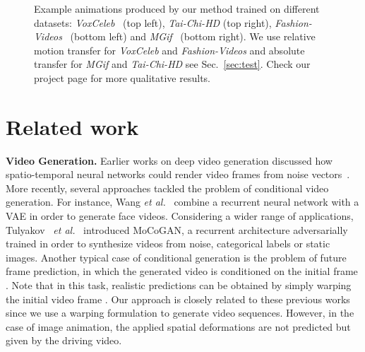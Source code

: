 \documentclass{article}
\def\etal{\textit{et al.}}
\begin{document}
\begin{figure*}[t]
{}

\caption{Example animations produced by our method trained on different datasets: \emph{VoxCeleb}~\cite{Nagrani17} (top left), \emph{Tai-Chi-HD} (top right), \emph{Fashion-Videos}~\cite{zablotskaia2019dwnet} (bottom left) and \emph{MGif}~\cite{siarohin2018animating} (bottom right). We use relative motion transfer for \emph{VoxCeleb} and \emph{Fashion-Videos} and absolute transfer for \emph{MGif} and \emph{Tai-Chi-HD} see Sec.~\ref{sec:test}. Check our project page for more qualitative results\protect\footnotemark[2].}

\label{fig:example-main}
\vspace{-0.5cm}
\end{figure*}



 \vspace{-0.2cm}
\section{Related work}
\vspace{-0.2cm}

\textbf{Video Generation.}
Earlier works on deep video generation discussed how spatio-temporal neural networks could render video frames from noise vectors~\cite{vondrick2016generating,saito2017temporal}. More recently, several approaches tackled the problem of conditional video generation. For instance, Wang \etal~\cite{wang2018every} combine a recurrent neural network with a VAE in order to generate face videos. 
Considering a wider range of applications, Tulyakov
~\etal~\cite{tulyakov2017mocogan} introduced MoCoGAN, a recurrent architecture adversarially trained in order to synthesize videos from noise, categorical labels or static images. Another typical case of conditional generation is the problem of future frame prediction, in which the generated video is conditioned on the initial frame \cite{finn2016unsupervised,oh2015action,srivastava2015unsupervised,van2017transformation,zhao2018learning}. Note that in this task, realistic predictions can be obtained by simply warping the initial video frame \cite{babaeizadeh2017stochastic,finn2016unsupervised,van2017transformation}. Our approach is closely related to these previous works since we use a warping formulation to generate video sequences. However, in the case of image animation, the applied spatial deformations are not predicted but given by the driving video. 
\end{document}
